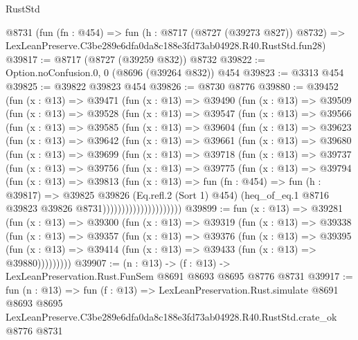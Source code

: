 \begin{lexlean}{RustStd}
\begin{coremodule}
    @8731
    (fun (fn : @454) =>
    fun (h : @8717 (@8727 (@39273 @827)) @8732) =>
    LexLeanPreserve.C3be289e6dfa0da8c188e3fd73ab04928.R40.RustStd.fun28)
@39817 := @8717 (@8727 (@39259 @832)) @8732
@39822 := Option.noConfusion.{0, 0} (@8696 (@39264 @832)) @454
@39823 := @3313 @454
@39825 := @39822 @39823 @454
@39826 := @8730 @8776
@39880 := @39452
    (fun (x : @13) =>
    @39471
      (fun (x : @13) =>
      @39490
        (fun (x : @13) =>
        @39509
          (fun (x : @13) =>
          @39528
            (fun (x : @13) =>
            @39547
              (fun (x : @13) =>
              @39566
                (fun (x : @13) =>
                @39585
                  (fun (x : @13) =>
                  @39604
                    (fun (x : @13) =>
                    @39623
                      (fun (x : @13) =>
                      @39642
                        (fun (x : @13) =>
                        @39661
                          (fun (x : @13) =>
                          @39680
                            (fun (x : @13) =>
                            @39699
                              (fun (x : @13) =>
                              @39718
                                (fun (x : @13) =>
                                @39737
                                  (fun (x : @13) =>
                                  @39756
                                    (fun (x : @13) =>
                                    @39775
                                      (fun (x : @13) =>
                                      @39794
                                        (fun (x : @13) =>
                                        @39813
                                          (fun (x : @13) =>
                                          fun (fn : @454) =>
                                          fun (h : @39817) =>
                                          @39825
                                            @39826
                                            (Eq.refl.{2} (Sort 1) @454)
                                            (heq_of_eq.{1}
                                              @8716
                                              @39823
                                              @39826
                                              @8731)))))))))))))))))))))
@39899 := fun (x : @13) =>
  @39281
    (fun (x : @13) =>
    @39300
      (fun (x : @13) =>
      @39319
        (fun (x : @13) =>
        @39338
          (fun (x : @13) =>
          @39357
            (fun (x : @13) =>
            @39376
              (fun (x : @13) =>
              @39395
                (fun (x : @13) => @39414 (fun (x : @13) => @39433 (fun (x : @13) => @39880)))))))))
@39907 := (n : @13) -> (f : @13) -> LexLeanPreservation.Rust.FunSem @8691 @8693 @8695 @8776 @8731
@39917 := fun (n : @13) =>
  fun (f : @13) =>
  LexLeanPreservation.Rust.simulate
    @8691
    @8693
    @8695
    LexLeanPreserve.C3be289e6dfa0da8c188e3fd73ab04928.R40.RustStd.crate_ok
    @8776
    @8731
\end{coremodule}
\end{lexlean}
